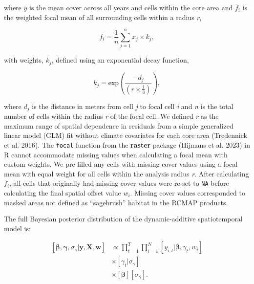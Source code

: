 \documentclass[
  12pt,
]{article}
\begin{document}
\noindent{}where \(\bar{y}\) is the mean cover across all years and cells within the core area and \(\bar{f}_{i}\) is the weighted focal mean of all surrounding cells within a radius \emph{r},

\begin{equation}
\bar{f}_{i} = \frac{1}{n} \sum_{j=1}^{n}x_{j} \times k_{j},
\end{equation}

\noindent{}with weights, \(k_{j}\), defined using an exponential decay function,

\begin{equation}
k_{j} = \text{exp}\left( \frac{-d_{j} }{\left(r\times\frac{1}{3} \right)} \right),
\end{equation}

\noindent{}where \(d_j\) is the distance in meters from cell \emph{j} to focal cell \emph{i} and \emph{n} is the total number of cells within the radius \emph{r} of the focal cell.
We defined \emph{r} as the maximum range of spatial dependence in residuals from a simple generalized linear model (GLM) fit without climate covariates for each core area (Tredennick et al. 2016).
The \texttt{focal} function from the \textbf{raster} package (Hijmans et al. 2023) in R cannot accommodate missing values when calculating a focal mean with custom weights.
We pre-filled any cells with missing cover values using a focal mean with equal weight for all cells within the analysis radius \emph{r}.
After calculating \(\bar{f}_{i}\), all cells that originally had missing cover values were re-set to \texttt{NA} before calculating the final spatial offset value \(w_i\).
Missing cover values corresponded to masked areas not defined as ``sagebrush'' habitat in the RCMAP products.

The full Bayesian posterior distribution of the dynamic-additive spatiotemporal model is:

\begin{align}
\left[\bm{\beta}, \bm{\gamma}, \sigma_{\gamma} | \textbf{y}, \textbf{X}, \textbf{w} \right] &\propto  \prod^T_{t=1} \prod^N_{i=1} \left[ y_{i,t}| \bm{\beta}, \gamma_t, w_i \right] \nonumber \\
&\times \left[ \gamma_t | \sigma_{\gamma} \right] \nonumber  \\
&\times \left[\bm{\beta}  \right] \left[ \sigma_{\gamma}\right].
\end{align}
\end{document}
